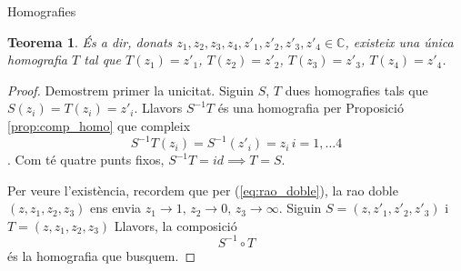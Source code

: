 \documentclass[dvipsnames, svgnames]{article}
\numberwithin{equation}{section}
\newtheorem{theorem}{Teorema}[section]
\theoremstyle{definition}
\theoremstyle{remark}
\newcommand{\C}{\mathbb{C}}
\begin{document}
\begin{section}{Homografies}
\begin{theorem}
        És a dir, donats $z_1,z_2,z_3,z_4,z'_1,z'_2,z'_3,z'_4\in\C$, existeix una única homografia $T$ tal que $T(z_1)=z'_1$, $T(z_2)=z'_2$, $T(z_3)=z'_3$, $T(z_4)=z'_4$.
    \end{theorem}
    \begin{proof}
        Demostrem primer la unicitat. Siguin $S$, $T$ dues homografies tals que $S(z_i)=T(z_i)=z'_i$. Llavors $S^{-1}T$ és una homografia per Proposició \ref{prop:comp_homo} que compleix \[S^{-1}T(z_i)=S^{-1}(z'_i)=z_i\, i=1,\dots4\]. Com té quatre punts fixos, $S^{-1}T=id\implies T=S$.

        Per veure l'existència, recordem que per (\ref{eq:rao_doble}), la rao doble $(z,z_1,z_2,z_3)$ ens envia $z_1\to1,\, z_2\to0,\, z_3\to\infty$. 
        Siguin $S=(z,z'_1,z'_2,z'_3)$ i $T=(z,z_1,z_2,z_3)$
        Llavors, la composició \begin{displaymath}
            S^{-1}\circ T
        \end{displaymath}
        és la homografia que busquem.
    \end{proof}
\end{section}
\end{document}
